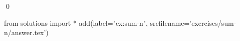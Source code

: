 \begin{ex}
  \label{ex:sum-n}
  
  \qed
\end{ex}
\begin{python0}
from solutions import *
add(label="ex:sum-n",
    srcfilename='exercises/sum-n/answer.tex') 
\end{python0}                              
